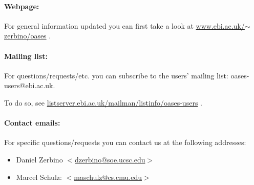 \documentclass[12pt]{article}
\begin{document}
\paragraph{Webpage:}

For general information updated you can first take a look at 
\href{http://www.ebi.ac.uk/~zerbino/oases/}{www.ebi.ac.uk/$\sim$zerbino/oases} .

\paragraph{Mailing list:}

For questions/requests/etc. you can subscribe to the users' mailing list: oases-users@ebi.ac.uk.

To do so, see \href{http://listserver.ebi.ac.uk/mailman/listinfo/oases-users}{listserver.ebi.ac.uk/mailman/listinfo/oases-users} .


\paragraph{Contact emails:}

For specific questions/requests you can contact us at the following addresses:
\begin{itemize}
\item Daniel Zerbino $<$\href{mailto:dzerbino@soe.ucsc.edu}{dzerbino@soe.ucsc.edu}$>$
\item Marcel Schulz: $<$\href{mailto:maschulz@cs.cmu.edu}{maschulz@cs.cmu.edu}$>$
\end{itemize}
\end{document}
